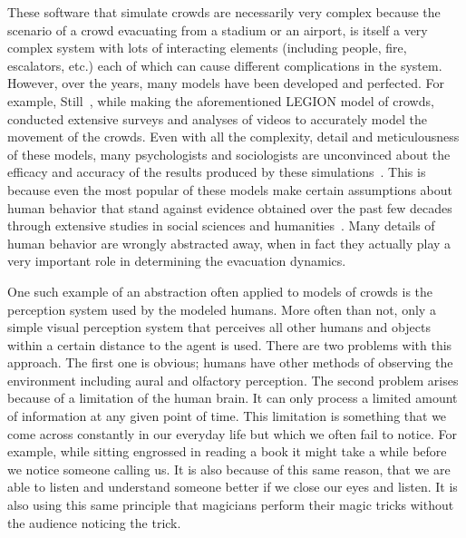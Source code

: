 These software that simulate crowds are necessarily very complex because the scenario of a crowd evacuating from a stadium or an airport, is itself a very complex system with lots of interacting elements (including people, fire, escalators, etc.) each of which can cause different complications in the system. However, over the years, many models have been developed and perfected. For example, Still~\cite{Still:2000tp}, while making the aforementioned LEGION model of crowds, conducted extensive surveys and analyses of videos to accurately model the movement of the crowds. Even with all the complexity, detail and meticulousness of these models, many psychologists and sociologists are unconvinced about the efficacy and accuracy of the results produced by these simulations~\cite{Aguirre:2004tn,Torres:2010tj,Sime:1995uu}. This is because even the most popular of these models make certain assumptions about human behavior that stand against evidence obtained over the past few decades through extensive studies in social sciences and humanities~\cite{Torres:2010tj,Sime:1995uu}. Many details of human behavior are wrongly abstracted away, when in fact they actually play a very important role in determining the evacuation dynamics.

One such example of an abstraction often applied to models of crowds is the perception system used by the modeled humans. More often than not, only a simple visual perception system that perceives all other humans and objects within a certain distance to the agent is used. There are two problems with this approach. The first one is obvious; humans have other methods of observing the environment including aural and olfactory perception. The second problem arises because of a limitation of the human brain. It can only process a limited amount of information at any given point of time. This limitation is something that we come across constantly in our everyday life but which we often fail to notice. For example, while sitting engrossed in reading a book it might take a while before we notice someone calling us. It is also because of this same reason, that we are able to listen and understand someone better if we close our eyes and listen. It is also using this same principle that magicians perform their magic tricks without the audience noticing the trick.

